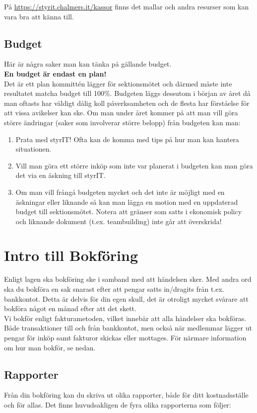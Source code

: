 \documentclass{article}
\begin{document}
På \href{https://styrit.chalmers.it/kassor}{https://styrit.chalmers.it/kassor} finns det mallar och andra resurser som kan vara bra att känna till.

\subsection*{Budget}
Här är några saker man kan tänka på gällande budget.\\
\textbf{En budget är endast en plan!}\\
Det är ett plan kommittén lägger för sektionsmötet och därmed måste inte resultatet matcha budget till 100\%.
Budgeten läggs dessutom i början av året då man oftasts har väldigt dålig koll påverksamheten och de flesta har förståelse för att vissa avikelser kan ske.
Om man under året kommer på att man vill göra större ändringar (saker som involverar större belopp) från budgeten kan man:
\begin{enumerate}
    \item Prata med styrIT! Ofta kan de komma med tips på hur man kan hantera situationen.
    \item Vill man göra ett större inköp som inte var planerat i budgeten kan man göra det via en äskning till styrIT.
    \item Om man vill frångå budgeten mycket och det inte är möjligt med en äskningar eller liknande så kan man lägga en motion med en uppdaterad budget till sektionsmötet. Notera att gränser som satts i ekonomisk policy och liknande dokument (t.ex. teambuilding) inte går att överskrida!
\end{enumerate}

\section{Intro till Bokföring}
Enligt lagen ska bokföring ske i samband med att händelsen sker. Med andra ord ska du bokföra en sak snarast efter att pengar satts in/dragits från t.ex. bankkontot. 
Detta är delvis för din egen skull, det är otroligt mycket svårare att bokföra något en månad efter att det skett.\\

Vi bokför enligt fakturametoden, vilket innebär att alla händelser ska bokföras. Både transaktioner till och från bankkontot, men också när medlemmar lägger ut pengar för inköp samt fakturor skickas eller mottages. För närmare information om hur man bokför, se nedan. 

\subsection*{Rapporter}
Från din bokföring kan du skriva ut olika rapporter, både för ditt kostnadsställe och för allas. Det finns huvudsakligen de fyra olika rapporterna som följer: 
\end{document}
